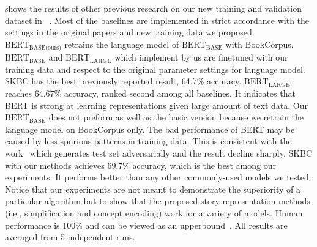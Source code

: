  shows the results of other previous research on our new training 
and validation dataset in ~. Most of the baselines are implemented in
 strict accordance with the settings in the original papers and new training data we proposed. 
$\text{BERT}_\text{BASE(ours)}$ retrains the 
language model of  $\text{BERT}_\text{BASE}$  with BookCorpus. $\text{BERT}_\text{BASE}$ and
 $\text{BERT}_\text{LARGE}$ which implement by us are finetuned with our training data and respect to the 
 original parameter settings for language model.
SKBC has the best previously reported result, 64.7\% accuracy.
$\text{BERT}_\text{LARGE}$ reaches 64.67\% accuracy, ranked second among all baselines. 
It indicates that BERT is strong at learning representations given large amount of text data. 
Our $\text{BERT}_\text{BASE}$ does not preform as well as the basic version because we retrain the 
language model on BookCorpus only. 
The bad performance of BERT may be caused by less spurious patterns in training data. 
This is consistent with the work~\cite{niven2019probing} which generates test set adversarially 
and the result decline sharply.
SKBC with our methods achieves 69.7\% accuracy, which is the best among our experiments. 
It performs better than any other commonly-used models we tested. 
Notice that our experiments are not meant to demonstrate the superiority of a
particular algorithm but to show that the proposed story representation 
methods (i.e., simplification and concept encoding) work for
a variety of models. 
Human performance is 100\% and can be viewed as an 
upperbound~\cite{mostafazadeh2016corpus}. 
All results are averaged from
5 independent runs. 


